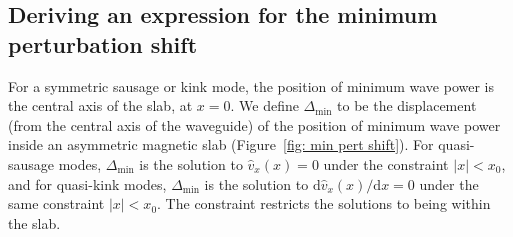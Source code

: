 \documentclass[12pt]{../style-files/ociamthesis}
\begin{document}
\subsection{Deriving an expression for the minimum perturbation shift} \label{sec: MPS derivation}

For a symmetric sausage or kink mode, the position of minimum wave power is the central axis of the slab, at $x = 0$. We define $\Delta_\textrm{min}$ to be the displacement (from the central axis of the waveguide) of the position of minimum wave power inside an asymmetric magnetic slab (Figure~\ref{fig: min pert shift}). For quasi-sausage modes, $\Delta_\textrm{min}$ is the solution to $\widehat{v}_x(x) = 0$ under the constraint $|x| < x_0$, and for quasi-kink modes, $\Delta_\textrm{min}$ is the solution to $\textrm{d}\widehat{v}_x (x) / \textrm{d}x = 0$ under the same constraint $|x| < x_0$. The constraint restricts the solutions to being within the slab. 
\end{document}
